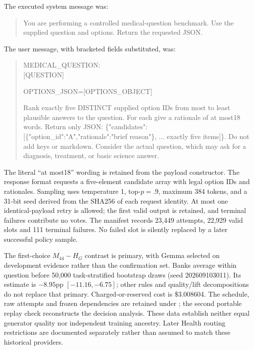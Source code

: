 The executed system message was:
\begin{quote}\footnotesize\ttfamily
You are performing a controlled medical-question benchmark. Use the supplied question and options. Return the requested JSON.
\end{quote}
The user message, with bracketed fields substituted, was:
\begin{quote}\footnotesize\ttfamily
MEDICAL\_QUESTION:\\
\mbox{[QUESTION]}

OPTIONS\_JSON=[OPTIONS\_OBJECT]

Rank exactly five DISTINCT supplied option IDs from most to least plausible answers to the question. For each give a rationale of at most18 words. Return only JSON: \{"candidates":[\{"option\_id":"A","rationale":"brief reason"\}, ... exactly five items]\}. Do not add keys or markdown. Consider the actual question, which may ask for a diagnosis, treatment, or basic science answer.
\end{quote}
The literal ``at most18'' wording is retained from the payload constructor. The response format requests a five-element candidate array with legal option IDs and rationales. Sampling uses temperature 1, top-$p=.9$, maximum 384 tokens, and a 31-bit seed derived from the SHA256 of each request identity. At most one identical-payload retry is allowed; the first valid output is retained, and terminal failures contribute no votes. The manifest records 23,449 attempts, 22,929 valid slots and 111 terminal failures. No failed slot is silently replaced by a later successful policy sample.

The first-choice $M_{44}-H_G$ contrast is primary, with Gemma selected on development evidence rather than the confirmation set. Banks average within question before 50,000 task-stratified bootstrap draws (seed 202609103011). Its estimate is $-8.95$pp $[-11.16,-6.75]$; other rules and quality/lift decompositions do not replace that primary. Charged-or-reserved cost is \$3.008604. The schedule, raw attempts and frozen dependencies are retained under ; the second portable replay check reconstructs the decision analysis. These data establish neither equal generator quality nor independent training ancestry. Later Health routing restrictions are documented separately rather than assumed to match these historical providers.


